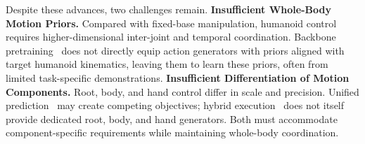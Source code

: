 Despite these advances, two challenges remain.
\textbf{ Insufficient Whole-Body Motion Priors.}
Compared with fixed-base manipulation, humanoid control requires higher-dimensional inter-joint and temporal coordination. Backbone pretraining~\cite{grootn1,psi0,motionwam,wholebodywam_wbc} does not directly equip action generators with priors aligned with target humanoid kinematics, leaving them to learn these priors, often from limited task-specific demonstrations.
\textbf{ Insufficient Differentiation of Motion Components.}
Root, body, and hand control differ in scale and precision. Unified prediction~\cite{openhlm,motionwam} may create competing objectives; hybrid execution~\cite{humanoidexo,wholebodyvla} does not itself provide dedicated root, body, and hand generators. Both must accommodate component-specific requirements while maintaining whole-body coordination.



